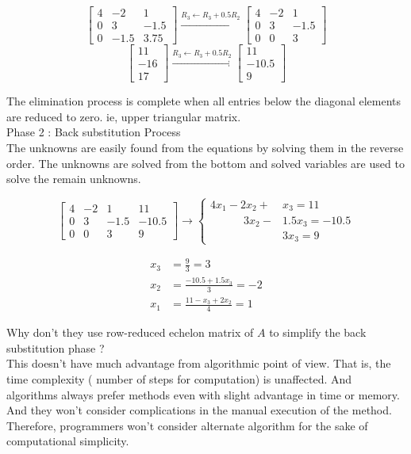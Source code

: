 	\[ \begin{bmatrix} 4 & -2 & 1 \\ 0 & 3 & -1.5 \\ 0 & -1.5 & 3.75 \end{bmatrix} \xrightarrow{R_3 \leftarrow R_3 + 0.5R_2} \begin{bmatrix} 4 & -2 & 1 \\ 0 & 3 & -1.5 \\ 0 & 0 & 3 \end{bmatrix} \]
	\[ \begin{bmatrix} 11 \\ -16 \\ 17 \end{bmatrix}  \xrightarrow{R_3 \leftarrow R_3 + 0.5R_2} \begin{bmatrix} 11 \\ -10.5 \\ 9 \end{bmatrix} \]

	The elimination process is complete when all entries below the diagonal elements are reduced to zero. ie, upper triangular matrix.\\

	Phase 2 : Back substitution Process\\

	The unknowns are easily found from the equations by solving them in the reverse order. The unknowns are solved from the bottom and solved variables are used to solve the remain unknowns.

	\[ \begin{bmatrix} 4 & -2 & 1 & 11 \\ 0 & 3 & -1.5 & -10.5 \\ 0 & 0 & 3 & 9 \end{bmatrix} \to \begin{cases} 4x_1 - 2x_2 + &x_3  = 11 \\ \quad \qquad 3x_2 - &1.5x_3  = -10.5 \\  &3x_3 = 9 \end{cases}  \]

	\begin{align*} x_3 & = \frac{9}{3} = 3 \\  x_2 & = \frac{-10.5 + 1.5x_3}{3} = -2 \\ x_1 & = \frac{11-x_3+2x_2}{4}=1 \end{align*}

\begin{remark}
\begin{commentary}
		Why don't they use row-reduced echelon matrix of $A$ to simplify the back substitution phase ?\\

		This doesn't have much advantage from algorithmic point of view. That is, the time complexity ( number of steps for computation) is unaffected. And algorithms always prefer methods even with slight advantage in time or memory. And they won't consider complications in the manual execution of the method. Therefore, programmers won't consider alternate algorithm for the sake of computational simplicity.
\end{commentary}
\end{remark}


